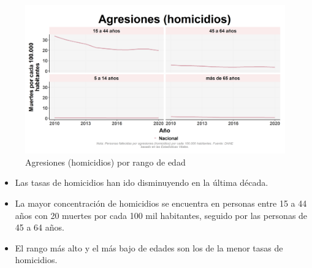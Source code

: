     \begin{figure}[H]
        \caption{Agresiones (homicidios) por rango de edad \label{map_result_2} }
        \begin{center}
        \includegraphics[width=\textwidth,keepaspectratio]{img/var_287_trend.png}
        \end{center}
    \end{figure}
            \begin{itemize}
                \item Las tasas de homicidios han ido disminuyendo en la última década.
                \item La mayor concentración de homicidios se encuentra en personas entre 15 a 44 años con 20 muertes por cada 100 mil habitantes, seguido por las personas de 45 a 64 años.
                \item El rango más alto y el más bajo de edades son los de la menor tasas de homicidios.
                \end{itemize}

